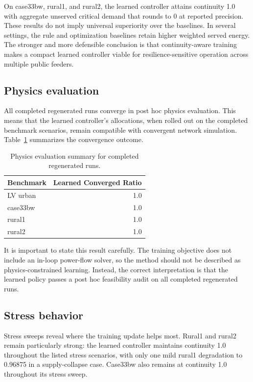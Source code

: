 \documentclass[11pt]{article}
\begin{document}
On case33bw, rural1, and rural2, the learned controller attains continuity 1.0 with aggregate unserved critical demand that rounds to 0 at reported precision. These results do not imply universal superiority over the baselines. In several settings, the rule and optimization baselines retain higher weighted served energy. The stronger and more defensible conclusion is that continuity-aware training makes a compact learned controller viable for resilience-sensitive operation across multiple public feeders.

\subsection{Physics evaluation}

All completed regenerated runs converge in post hoc physics evaluation. This means that the learned controller's allocations, when rolled out on the completed benchmark scenarios, remain compatible with convergent network simulation. Table~\ref{tab:physics-summary} summarizes the convergence outcome.

\begin{table}[t]
\centering
\small
\caption{Physics evaluation summary for completed regenerated runs.}
\label{tab:physics-summary}
\begin{tabular}{lr}
\toprule
Benchmark & Learned Converged Ratio \\
\midrule
LV urban & 1.0 \\
case33bw & 1.0 \\
rural1 & 1.0 \\
rural2 & 1.0 \\
\bottomrule
\end{tabular}
\end{table}

It is important to state this result carefully. The training objective does not include an in-loop power-flow solver, so the method should not be described as physics-constrained learning. Instead, the correct interpretation is that the learned policy passes a post hoc feasibility audit on all completed regenerated runs.

\subsection{Stress behavior}

Stress sweeps reveal where the training update helps most. Rural1 and rural2 remain particularly strong: the learned controller maintains continuity 1.0 throughout the listed stress scenarios, with only one mild rural1 degradation to 0.96875 in a supply-collapse case. Case33bw also remains at continuity 1.0 throughout its stress sweep.
\end{document}
